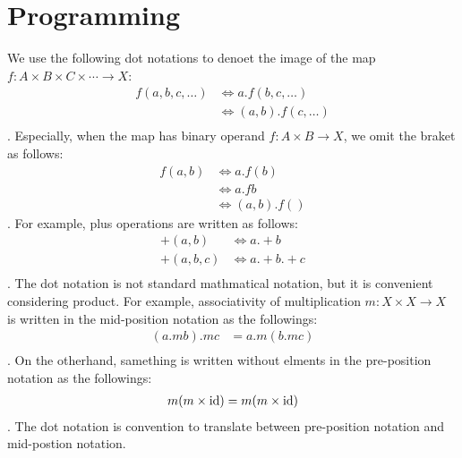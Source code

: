 \section{Programming}
We use the following dot notations to denoet the image of the map 
$f:A\times B\times C\times\cdots\to X$:
\begin{equation}\begin{split}
	f(a, b, c, \dots) &\Leftrightarrow a.f(b, c,\dots) \\
		&\Leftrightarrow (a,b).f(c,\dots) \\
\end{split}\end{equation}
. Especially, when the map has binary operand $f:A\times B\to X$,
we omit the braket as follows:
\begin{equation}\begin{split}
	f(a, b) &\Leftrightarrow a.f(b) \\
		&\Leftrightarrow a.fb \\
		&\Leftrightarrow (a,b).f()
\end{split}\end{equation}
. For example, plus operations are written as follows:
\begin{equation}\begin{split}
	+(a, b) &\Leftrightarrow a .+ b \\
	+(a, b, c) &\Leftrightarrow a .+ b .+ c \\
\end{split}\end{equation}
. The dot notation is not standard mathmatical notation, 
but it is convenient considering product. For example, associativity
of multiplication $m:X\times X\to X$ is written in the mid-position notation
as the followings:
\begin{equation}\begin{split}
	(a.m b).m c &= a.m (b.m c) \\
\end{split}\end{equation}
. On the otherhand, samething is written without elments 
in the pre-position notation as the followings:
\begin{equation}\begin{split}
	m(m\times {\operatorname{id}}) &= m(m\times {\operatorname{id}}) \\
\end{split}\end{equation}
. The dot notation is convention to translate between pre-position notation
and mid-postion notation.

